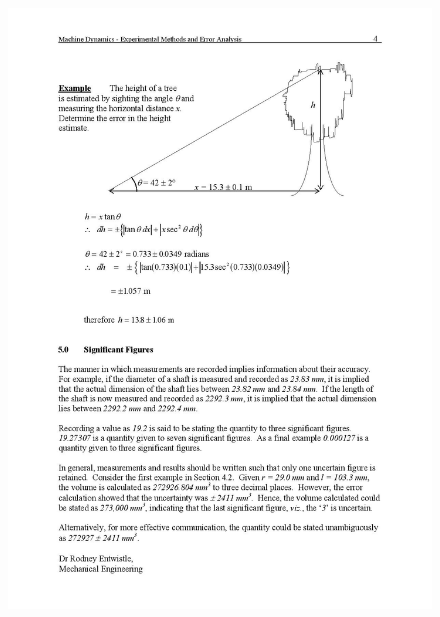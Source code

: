 \documentclass[12pt,a4paper]{report}
\begin{document}
\begin{figure}
  \includegraphics[width=\linewidth]{error/e4}
  \caption*{}
\label{}
\end{figure}
\end{document}
